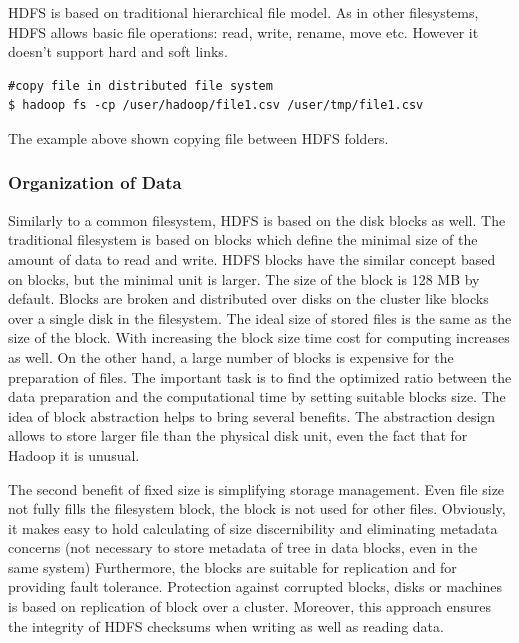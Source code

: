 \documentclass[a4paper,12pt,oneside]{report}
\begin{document}
	HDFS is based on traditional hierarchical file model. As in other filesystems,
	HDFS allows basic file operations: 
	read, write, rename, move etc. However it doesn’t support hard and soft links. 
	
	\begin{footnotesize}
		\begin{lstlisting}[style=mybash]
#copy file in distributed file system
$ hadoop fs -cp /user/hadoop/file1.csv /user/tmp/file1.csv 
		\end{lstlisting}
	\end{footnotesize} 
	The example above shown copying file between HDFS folders. 
	
	
	\subsubsection{Organization of Data}
	Similarly to  a common filesystem, HDFS is based on the disk blocks as well. The
	traditional
	filesystem is based on blocks which define the minimal size of the amount of
	data to read and write.
	HDFS blocks have the similar concept based on blocks, but the minimal unit is
	larger. The size of the block is 128 MB by default. Blocks are broken and
	distributed
	over disks on the cluster like blocks over a single disk in the filesystem. The
	ideal 
	size of stored files is the same as the size of the block. With increasing the
	block 
	size time cost for computing increases as well. On the other hand, a large
	number
	of blocks is expensive for the preparation of files. The important task is to
	find the optimized 
	ratio between the data preparation and the computational time by setting suitable
	blocks size.
	The idea of block abstraction helps to bring several benefits.
	The abstraction design allows to store larger file than the physical disk
	unit, 
	even the fact that for Hadoop it is unusual.
	
	The second benefit of fixed size is simplifying storage management. Even file
	size not fully 		
	fills the filesystem block, the block is not used for other files.
	Obviously, it makes easy 
	to hold calculating of size discernibility and eliminating metadata concerns
	(not necessary 
	to store metadata of tree in data blocks, even in the same system)
	Furthermore, the blocks are suitable for replication and for providing fault
	tolerance. Protection
	against corrupted blocks, disks or machines is based on replication of block
	over a cluster. 
	Moreover, this approach ensures the integrity of HDFS checksums when writing as
	well as reading data.
	
\end{document}
